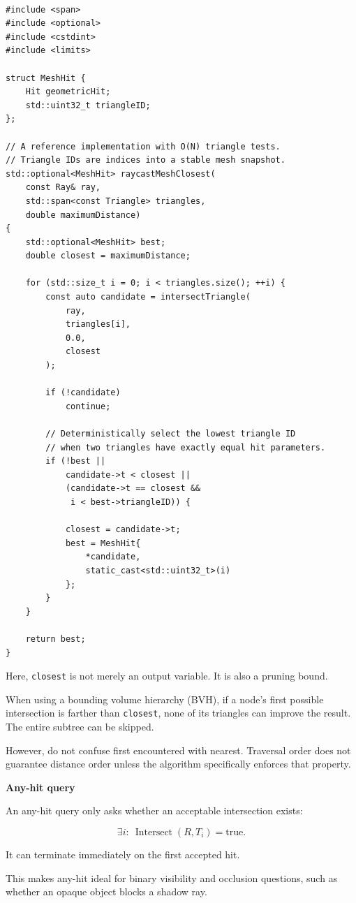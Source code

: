 \begin{verbatim}

#include <span>
#include <optional>
#include <cstdint>
#include <limits>

struct MeshHit {
    Hit geometricHit;
    std::uint32_t triangleID;
};

// A reference implementation with O(N) triangle tests.
// Triangle IDs are indices into a stable mesh snapshot.
std::optional<MeshHit> raycastMeshClosest(
    const Ray& ray,
    std::span<const Triangle> triangles,
    double maximumDistance)
{
    std::optional<MeshHit> best;
    double closest = maximumDistance;

    for (std::size_t i = 0; i < triangles.size(); ++i) {
        const auto candidate = intersectTriangle(
            ray,
            triangles[i],
            0.0,
            closest
        );

        if (!candidate)
            continue;

        // Deterministically select the lowest triangle ID
        // when two triangles have exactly equal hit parameters.
        if (!best ||
            candidate->t < closest ||
            (candidate->t == closest &&
             i < best->triangleID)) {

            closest = candidate->t;
            best = MeshHit{
                *candidate,
                static_cast<std::uint32_t>(i)
            };
        }
    }

    return best;
}
\end{verbatim}

Here, \texttt{closest} is not merely an output variable. It is also a pruning bound.

When using a bounding volume hierarchy (BVH), if a node's first possible intersection is farther than \texttt{closest}, none of its triangles can improve the result. The entire subtree can be skipped.

However, do not confuse first encountered with nearest. Traversal order does not guarantee distance order unless the algorithm specifically enforces that property.

\textbf{Any-hit query}

An any-hit query only asks whether an acceptable intersection exists:

\[
\exists i:\ \operatorname{Intersect}(R,T_i)=\text{true}.
\]

It can terminate immediately on the first accepted hit.

This makes any-hit ideal for binary visibility and occlusion questions, such as whether an opaque object blocks a shadow ray.

